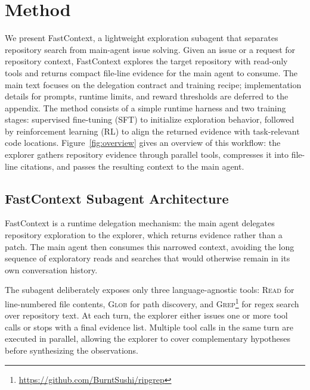 \documentclass[11pt]{article}
\newcommand{\approach}{{FastContext}\xspace}
\begin{document}
\vspace{-2mm}
\section{Method}
\label{sec:method}

\vspace{-2mm}
We present \approach, a lightweight exploration subagent that separates repository search from main-agent issue solving.
Given an issue or a request for repository context, \approach explores the target repository with read-only tools and returns compact file-line evidence for the main agent to consume.
The main text focuses on the delegation contract and training recipe; implementation details for prompts, runtime limits, and reward thresholds are deferred to the appendix.
The method consists of a simple runtime harness and two training stages: supervised fine-tuning (SFT) to initialize exploration behavior, followed by reinforcement learning (RL) to align the returned evidence with task-relevant code locations.
Figure~\ref{fig:overview} gives an overview of this workflow: the explorer gathers repository evidence through parallel tools, compresses it into file-line citations, and passes the resulting context to the main agent.




\vspace{-2mm}
\subsection{\approach Subagent Architecture}
\label{sec:architecture}

\vspace{-1mm}
\approach is a runtime delegation mechanism: the main agent delegates repository exploration to the explorer, which returns evidence rather than a patch.
The main agent then consumes this narrowed context, avoiding the long sequence of exploratory reads and searches that would otherwise remain in its own conversation history.

The subagent deliberately exposes only three language-agnostic tools: \textsc{Read} for line-numbered file contents, \textsc{Glob} for path discovery, and \textsc{Grep}\footnote{\url{https://github.com/BurntSushi/ripgrep}} for regex search over repository text.
At each turn, the explorer either issues one or more tool calls or stops with a final evidence list.
Multiple tool calls in the same turn are executed in parallel, allowing the explorer to cover complementary hypotheses before synthesizing the observations.
\end{document}
